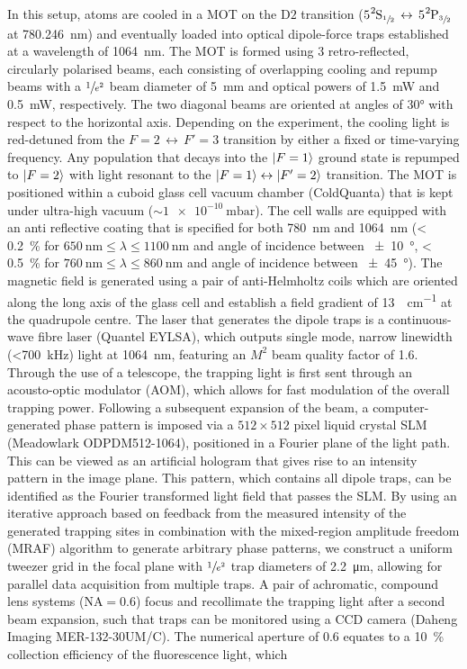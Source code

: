\documentclass[../Thesis-IJspeert.tex]{subfiles}
\begin{document}
In this setup,  atoms are cooled in a MOT on the $\mathrm{D}2$ transition ($\ce{5\!^2S_{\sfrac{1}{2}}} \, \leftrightarrow \, \ce{5\!^2P_{\sfrac{3}{2}}}$ at \SI{780.246}{\nm}) and eventually loaded into optical dipole-force traps established at a wavelength of \SI{1064}{\nm}. The MOT is formed using $3$ retro-reflected, circularly polarised beams, each consisting of overlapping cooling and repump beams with a $\sfrac{1}{e^2}$ beam diameter of \SI{5}{\milli\meter} and optical powers of \SI{1.5}{\milli\watt} and \SI{0.5}{\milli\watt}, respectively. The two diagonal beams are oriented at angles of \ang{30} with respect to the horizontal axis. Depending on the experiment, the cooling light is red-detuned from the $F=2 \, \leftrightarrow \, F'=3$ transition by either a fixed or time-varying frequency. Any population that decays into the $\ket{F=1}$ ground state is repumped to $\ket{F=2}$ with light resonant to the $\ket{F=1}\leftrightarrow\ket{F'=2}$ transition. The MOT is positioned within a cuboid glass cell vacuum chamber (ColdQuanta) that is kept under ultra-high vacuum ($\sim\!\SI{1e-10}{\milli\bar}$). The cell walls are equipped with an anti reflective coating that is specified for both \SI{780}{\nm} and \SI{1064}{\nm} (\SI{< 0.2}{\percent} for $\SI{650}{\nm} \leq \lambda \leq \SI{1100}{\nm}$ and angle of incidence between \SI{\pm 10}{\degree}, \SI{< 0.5}{\percent} for $\SI{760}{\nm} \leq \lambda \leq \SI{860}{\nm}$ and angle of incidence between \SI{\pm 45}{\degree}). The magnetic field is generated using a pair of anti-Helmholtz coils which are oriented along the long axis of the glass cell and establish a field gradient of \SI{13}{\gauss\per\centi\meter} at the quadrupole centre. The laser that generates the dipole traps is a continuous-wave fibre laser (Quantel EYLSA), which outputs single mode, narrow linewidth (\SI{<700}{\kHz}) light at \SI{1064}{\nm}, featuring an $M^2$ beam quality factor of \num{1.6}. Through the use of a telescope, the trapping light is first sent through an acousto-optic modulator (AOM), which allows for fast modulation of the overall trapping power. Following a subsequent expansion of the beam, a computer-generated phase pattern is imposed via a $512\times512$ pixel liquid crystal SLM (Meadowlark ODPDM512-1064), positioned in a Fourier plane of the light path. This can be viewed as an artificial hologram that gives rise to an intensity pattern in the image plane. This pattern, which contains all dipole traps, can be identified as the Fourier transformed light field that passes the SLM. By using an iterative approach based on feedback from the measured intensity of the generated trapping sites in combination with the mixed-region amplitude freedom (MRAF) algorithm \cite{Pasienski2008} to generate arbitrary phase patterns, we construct a uniform tweezer grid in the focal plane with $\sfrac{1}{e^2}$ trap diameters of \SI{2.2}{\micro\meter}, allowing for parallel data acquisition from multiple traps. A pair of achromatic, compound lens systems ($\mathrm{NA} = 0.6$) focus and recollimate the trapping light after a second beam expansion, such that traps can be monitored using a CCD camera (Daheng Imaging MER-132-30UM/C). The numerical aperture of \num{0.6} equates to a \SI{10}{\percent} collection efficiency of the fluorescence light, which 
\end{document}
